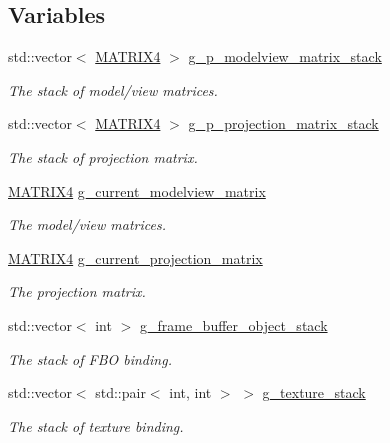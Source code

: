 \subsection*{Variables}
\begin{DoxyCompactItemize}
\item 
std::vector$<$ \hyperlink{class_math_1_1_matrix4x4}{MATRIX4} $>$ \hyperlink{namespace_utilities_af9f46e572978db79176b61edb1780b3c}{g\_\-p\_\-modelview\_\-matrix\_\-stack}
\begin{DoxyCompactList}\small\item\em The stack of model/view matrices. \end{DoxyCompactList}\item 
std::vector$<$ \hyperlink{class_math_1_1_matrix4x4}{MATRIX4} $>$ \hyperlink{namespace_utilities_a3e2a3a6c251bba50ffe4c069d085e0b7}{g\_\-p\_\-projection\_\-matrix\_\-stack}
\begin{DoxyCompactList}\small\item\em The stack of projection matrix. \end{DoxyCompactList}\item 
\hyperlink{class_math_1_1_matrix4x4}{MATRIX4} \hyperlink{namespace_utilities_accdb6ed1387ebfbb3458b12fc5104fc0}{g\_\-current\_\-modelview\_\-matrix}
\begin{DoxyCompactList}\small\item\em The model/view matrices. \end{DoxyCompactList}\item 
\hyperlink{class_math_1_1_matrix4x4}{MATRIX4} \hyperlink{namespace_utilities_a8c2454e701dfbb5ec835d7d3a36869c5}{g\_\-current\_\-projection\_\-matrix}
\begin{DoxyCompactList}\small\item\em The projection matrix. \end{DoxyCompactList}\item 
std::vector$<$ int $>$ \hyperlink{namespace_utilities_a0c685e4387f8e43c77ef5931a213cfaf}{g\_\-frame\_\-buffer\_\-object\_\-stack}
\begin{DoxyCompactList}\small\item\em The stack of FBO binding. \end{DoxyCompactList}\item 
std::vector$<$ std::pair$<$ int, int $>$ $>$ \hyperlink{namespace_utilities_a0f11bcfd46f3b7d0bdf66bc2127ba85f}{g\_\-texture\_\-stack}
\begin{DoxyCompactList}\small\item\em The stack of texture binding. \end{DoxyCompactList}\item 

\end{DoxyCompactItemize}
